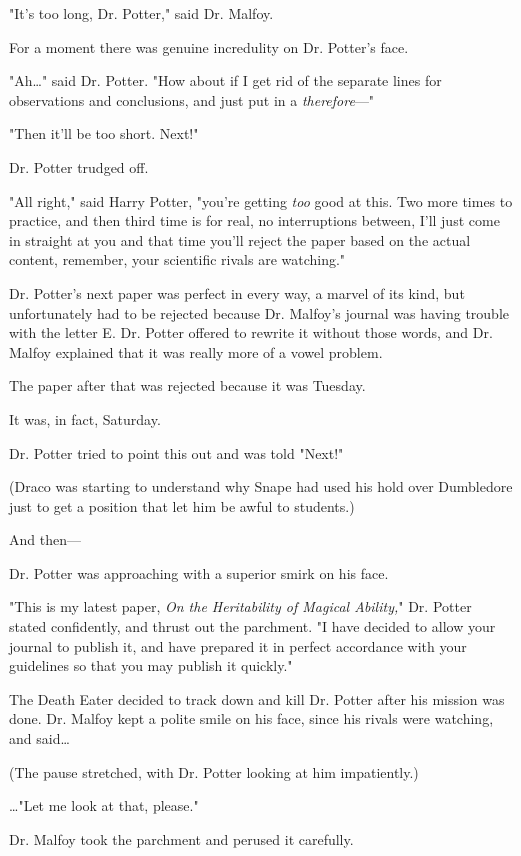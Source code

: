 "It's too long, Dr. Potter," said Dr. Malfoy.

For a moment there was genuine incredulity on Dr. Potter's face.

"Ah{\ldots}" said Dr. Potter. "How about if I get rid of the separate lines for 
observations and conclusions, and just put in a \emph{therefore}---"

"Then it'll be too short. Next!"

Dr. Potter trudged off.

"All right," said Harry Potter, "you're getting \emph{too} good at this. Two 
more times to practice, and then third time is for real, no interruptions 
between, I'll just come in straight at you and that time you'll reject the 
paper based on the actual content, remember, your scientific rivals are 
watching."

Dr. Potter's next paper was perfect in every way, a marvel of its kind, but 
unfortunately had to be rejected because Dr. Malfoy's journal was having 
trouble with the letter E. Dr. Potter offered to rewrite it without those 
words, and Dr. Malfoy explained that it was really more of a vowel problem.

The paper after that was rejected because it was Tuesday.

It was, in fact, Saturday.

Dr. Potter tried to point this out and was told "Next!"

(Draco was starting to understand why Snape had used his hold over Dumbledore 
just to get a position that let him be awful to students.)

And then---

Dr. Potter was approaching with a superior smirk on his face.

"This is my latest paper, \emph{On the Heritability of Magical Ability,}" Dr. 
Potter stated confidently, and thrust out the parchment. "I have decided to 
allow your journal to publish it, and have prepared it in perfect accordance 
with your guidelines so that you may publish it quickly."

The Death Eater decided to track down and kill Dr. Potter after his mission was 
done. Dr. Malfoy kept a polite smile on his face, since his rivals were 
watching, and said{\ldots}

(The pause stretched, with Dr. Potter looking at him impatiently.)

{\ldots}"Let me look at that, please."

Dr. Malfoy took the parchment and perused it carefully.

